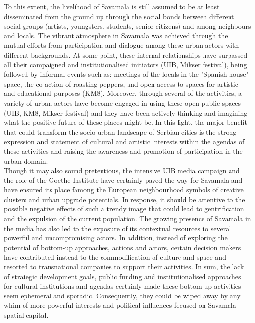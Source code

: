 \documentclass[11pt]{report}
\begin{document}
To this extent, the livelihood of Savamala is still assumed to be at least disseminated from the ground up through the social bonds between different social groups (artists, youngsters, students, senior citizens) and among neighbours and locals.
The vibrant atmosphere in Savamala was achieved through the mutual efforts from participation and dialogue among these urban actors with different backgrounds.
At some point, these internal relationships have surpassed all their campaigned and institutionalised initiators (UIB, Mikser festival), being followed by informal events such as:
meetings of the locals in the "Spanish house" space, the co-action of roasting peppers, and open access to spaces for artistic and educational purposes (KM8).
Moreover, through several of the activities, a variety of urban actors have become engaged in using these open public spaces (UIB, KM8, Mikser festival) and they have been actively thinking and imagining what the positive future of these places might be. In this light, the major benefit that could transform the socio-urban landscape of Serbian cities is the strong expression and statement of cultural and artistic interests within the agendas of these activities and raising the awareness and promotion of participation in the urban domain.
\\

Though it may also sound pretentious, the intensive UIB media campaign  and the role of the Goethe-Institute have certainly paved the way for Savamala and have ensured its place famong the European neighbourhood symbols of creative clusters and urban upgrade potentials.
In response, it should be attentive to the possible negative effects of such a trendy image that could lead to gentrification and the expulsion of the current population.
The growing presence of Savamala in the media has also led to the exposure of its contextual resources to several powerful and uncompromising actors.
In addition, instead of exploring the potential of bottom-up approaches, actions and actors, certain decision makers have contributed instead to the commodification of culture and space and resorted to transnational companies  to support their activities.
In sum, the lack of strategic development goals, public funding and institutionalised approaches for cultural institutions and agendas certainly made these bottom-up activities seem ephemeral and sporadic. Consequently, they could be wiped away by any whim of more powerful interests and political influences focused on Savamala spatial capital.
\\
\end{document}

